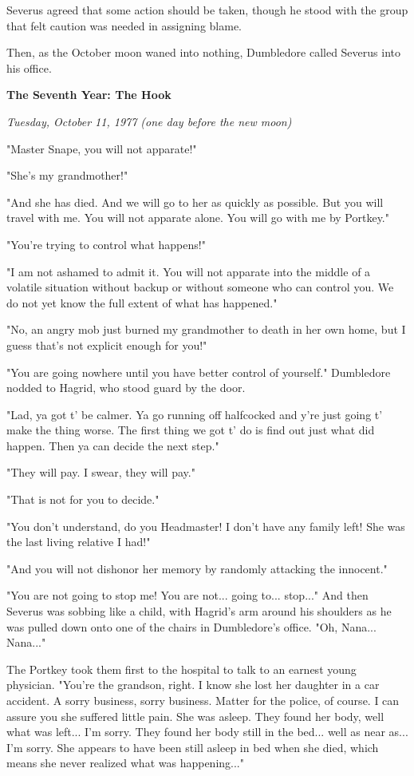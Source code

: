 \documentclass[a4paper,11pt]{article}
\begin{document}
Severus agreed that some action should be taken, though he stood with the group that felt caution was needed in assigning blame.

Then, as the October moon waned into nothing, Dumbledore called Severus into his office.

\textbf{The Seventh Year: The Hook}

\emph{Tuesday, October 11, 1977 (one day before the new moon)}

"Master Snape, you will not apparate!"

"She's my grandmother!"

"And she has died. And we will go to her as quickly as possible. But you will travel with me. You will not apparate alone. You will go with me by Portkey."

"You're trying to control what happens!"

"I am not ashamed to admit it. You will not apparate into the middle of a volatile situation without backup or without someone who can control you. We do not yet know the full extent of what has happened."

"No, an angry mob just burned my grandmother to death in her own home, but I guess that's not explicit enough for you!"

"You are going nowhere until you have better control of yourself." Dumbledore nodded to Hagrid, who stood guard by the door.

"Lad, ya got t' be calmer. Ya go running off halfcocked and y're just going t' make the thing worse. The first thing we got t' do is find out just what did happen. Then ya can decide the next step."

"They will pay. I swear, they will pay."

"That is not for you to decide."

"You don't understand, do you Headmaster! I don't have any family left! She was the last living relative I had!"

"And you will not dishonor her memory by randomly attacking the innocent."

"You are not going to stop me! You are not... going to... stop..." And then Severus was sobbing like a child, with Hagrid's arm around his shoulders as he was pulled down onto one of the chairs in Dumbledore's office. "Oh, Nana... Nana..."

The Portkey took them first to the hospital to talk to an earnest young physician. "You're the grandson, right. I know she lost her daughter in a car accident. A sorry business, sorry business. Matter for the police, of course. I can assure you she suffered little pain. She was asleep. They found her body, well what was left... I'm sorry. They found her body still in the bed... well as near as... I'm sorry. She appears to have been still asleep in bed when she died, which means she never realized what was happening..."
\end{document}
